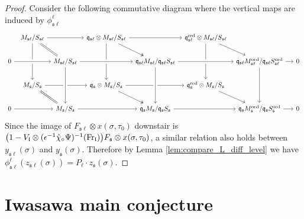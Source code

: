 \documentclass[leqno]{amsart}
\theoremstyle{definition}
\theoremstyle{remark}
\newcommand{\Fr}{\textnormal{Fr}} %
\newcommand{\fl}{\mathfrak{l}}
\newcommand{\fq}{\mathfrak{q}}
\newcommand{\fs}{\mathfrak{s}}
\newcommand{\red}{\textnormal{red}}
\newcommand{\ord}{\textnormal{ord}} %
\begin{document}
\begin{proof}
Consider the following commutative diagram
where the vertical maps
are induced by $\phi_{\fs\ell}^\ell$
\begin{equation*}
\begin{tikzcd}[column sep=tiny]
& M_{\fs\ell}/S_{\fs\ell}\arrow{dd} \arrow[rd,equal]\arrow[rr]
&& \fq_{\fs\ell}\otimes M_{\fs\ell}/S_{\fs\ell}
	\arrow[rd,twoheadrightarrow]\arrow[rr]\arrow[dd]
&& \fq_{\fs\ell}^{\red}\otimes M_{\fs\ell}/S_{\fs\ell}\arrow[dd]\arrow[rd]\\
0 \arrow[crossing over]{rr} 
&& M_{\fs\ell}/S_{\fs\ell}
	\arrow[crossing over]{dd} \arrow[crossing over]{rr} 
&& \fq_{\fs\ell}M_{\fs\ell}/\fq_{\fs\ell}S_{\fs\ell}
	\arrow[crossing over]{dd}\arrow[crossing over]{rr} 
&& \fq_{\fs\ell}M_{\fs\ell}^{\ord}/\fq_{\fs\ell}S^{\ord}_{\fs\ell}
	\arrow{dd} \arrow[rr] && 0\\
& M_{\fs}/S_{\fs}\arrow{rr}\arrow[rd,equal]
&& \fq_{\fs}\otimes M_{\fs}/S_{\fs}
	\arrow{rr} \arrow[rd,twoheadrightarrow]
&& \fq_{\fs}^{\red}\otimes M_{\fs}/S_{\fs} \arrow[rd]& & & \\
0 \arrow[crossing over]{rr} 
&& M_{\fs}/S_{\fs} \arrow[crossing over]{rr} 
&& \fq_{\fs}M_{\fs}/\fq_{\fs}S_{\fs}\arrow[crossing over]{rr} 
&& \fq_{\fs}M_{\fs}^{\ord}/\fq_{\fs}S_{\fs}^{\ord} \arrow[rr] && 0
\arrow[from=2-3,to=4-3,crossing over]
\arrow[from=2-5,to=4-5,crossing over]
\end{tikzcd}
\end{equation*}
Since the image of 
$F_{\fs\ell}\otimes x(\sigma,\tau_0)$
downstair is 
$\big(1-V_\fl\otimes(\epsilon^{-1}\hat{\chi}_\circ\Psi)^{-1}
(\Fr_\fl)\big)F_{\fs}\otimes x(\sigma,\tau_0)$,
a similar relation also holds
between $y_{\fs\ell}(\sigma)$ and $y_\fs(\sigma)$.
Therefore by Lemma \ref{lem:compare_L_diff_level} we have
$\phi_{\fs\ell}^\ell(z_{\fs\ell}(\sigma))=P_\ell\cdot z_{\fs}(\sigma)$.

	
\end{proof}


\section{Iwasawa main conjecture}
\end{document}
